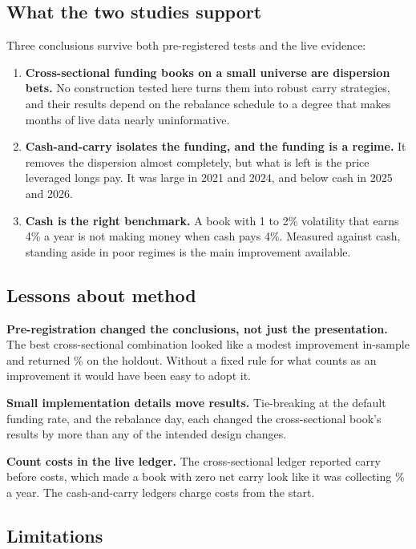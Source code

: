 \documentclass[11pt,a4paper]{article}
\begin{document}
\subsection{What the two studies support}

Three conclusions survive both pre-registered tests and the live evidence:

\begin{enumerate}
  \item \textbf{Cross-sectional funding books on a small universe are dispersion bets.}
  No construction tested here turns them into robust carry strategies, and their
  results depend on the rebalance schedule to a degree that makes months of live data
  nearly uninformative.
  \item \textbf{Cash-and-carry isolates the funding, and the funding is a regime.} It
  removes the dispersion almost completely, but what is left is the price leveraged
  longs pay. It was large in 2021 and 2024, and below cash in 2025 and 2026.
  \item \textbf{Cash is the right benchmark.} A book with 1 to 2\% volatility that earns
  4\% a year is not making money when cash pays 4\%. Measured against cash, standing
  aside in poor regimes is the main improvement available.
\end{enumerate}

\subsection{Lessons about method}

\textbf{Pre-registration changed the conclusions, not just the presentation.} The best
cross-sectional combination looked like a modest improvement in-sample and returned
\HoldBestXscTotal\%
on the holdout. Without a fixed rule for what counts as an improvement it would have
been easy to adopt it.

\textbf{Small implementation details move results.} Tie-breaking at the default
funding rate, and the rebalance day, each changed the cross-sectional book's results
by more than any of the intended design changes.

\textbf{Count costs in the live ledger.} The cross-sectional ledger reported carry
before costs, which made a book with zero net carry look like it was collecting
\LiveCarryAnn\% a year. The cash-and-carry ledgers charge costs from the start.

\subsection{Limitations}
\end{document}
